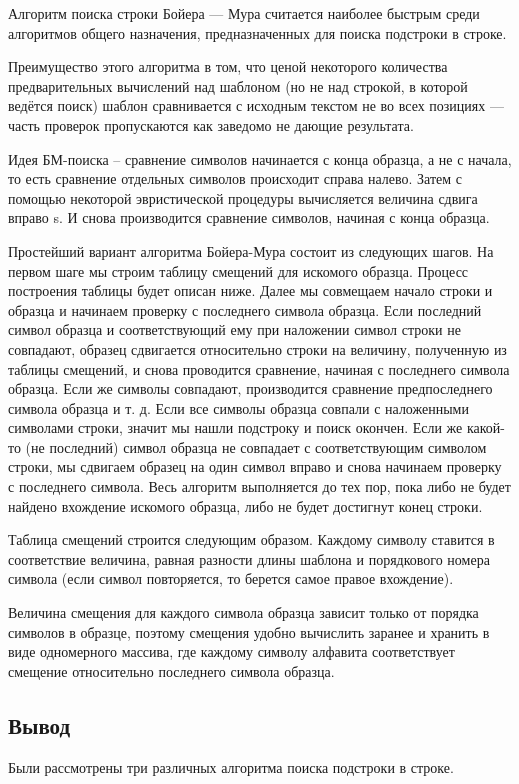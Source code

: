 \documentclass[a4paper, 14pt]{article}
\begin{document}
Алгоритм поиска строки Бойера — Мура считается наиболее быстрым среди алгоритмов общего назначения, предназначенных для поиска подстроки в строке.

Преимущество этого алгоритма в том, что ценой некоторого количества предварительных вычислений над шаблоном (но не над строкой, в которой ведётся поиск) шаблон сравнивается с исходным текстом не во всех позициях — часть проверок пропускаются как заведомо не дающие результата.

Идея БМ-поиска – сравнение символов начинается с конца образца, а не с начала, то есть сравнение отдельных символов происходит справа налево. Затем с помощью некоторой эвристической процедуры вычисляется величина сдвига вправо s. И снова производится сравнение символов, начиная с конца образца.

Простейший вариант алгоритма Бойера-Мура состоит из следующих шагов. На первом шаге мы строим таблицу смещений для искомого образца. Процесс построения таблицы будет описан ниже. Далее мы совмещаем начало строки и образца и начинаем проверку с последнего символа образца. Если последний символ образца и соответствующий ему при наложении символ строки не совпадают, образец сдвигается относительно строки на величину, полученную из таблицы смещений, и снова проводится сравнение, начиная с последнего символа образца. Если же символы совпадают, производится сравнение предпоследнего символа образца и т. д. Если все символы образца совпали с наложенными символами строки, значит мы нашли подстроку и поиск окончен. Если же какой-то (не последний) символ образца не совпадает с соответствующим символом строки, мы сдвигаем образец на один символ вправо и снова начинаем проверку с последнего символа. Весь алгоритм выполняется до тех пор, пока либо не будет найдено вхождение искомого образца, либо не будет достигнут конец строки.

Таблица смещений строится следующим образом. Каждому символу ставится в соответствие величина, равная разности длины шаблона и порядкового номера символа (если символ повторяется, то берется самое правое вхождение).

Величина смещения для каждого символа образца зависит только от порядка символов в образце, поэтому смещения удобно вычислить заранее и хранить в виде одномерного массива, где каждому символу алфавита соответствует смещение относительно последнего символа образца.

	\subsection{Вывод}
	Были рассмотрены три различных алгоритма поиска подстроки в строке.
	
\end{document}
